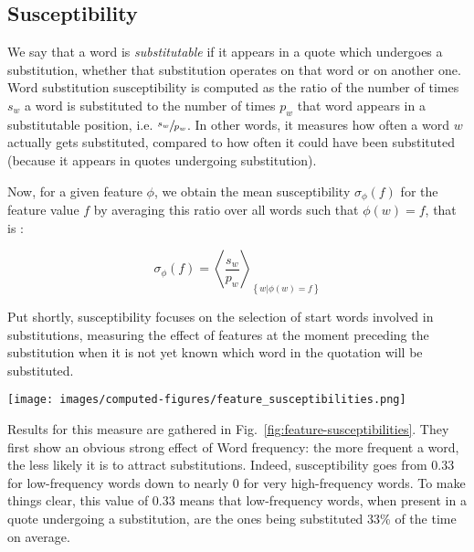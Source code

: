 \subsection{Susceptibility}

We say that a word is \emph{substitutable} if it appears in a quote which undergoes a substitution, whether that substitution operates on that word or on another one.
Word substitution susceptibility is computed as the ratio of the number of times $s_w$ a word is substituted to the number of times $p_w$ that word appears in a substitutable position, \hbox{i.e.} $\sfrac{s_w}{p_w}$. {In other words, it measures how often a word $w$ actually gets substituted, compared to how often it could have been substituted (because it appears in quotes undergoing substitution)}.

Now, for a given feature $\phi$, we obtain the mean susceptibility $\sigma_{\phi}(f)$ for the feature value $f$ by averaging this ratio over all words such that $\phi(w) = f$, that is%
:

$$\sigma_{\phi}(f) = \left< \frac{s_w}{p_w} \right>_{\left\lbrace w | \phi(w) = f \right\rbrace}$$

Put shortly, susceptibility focuses on the selection of start words involved in substitutions, measuring the effect of features at the moment preceding the substitution when it is not yet known which word in the quotation will be substituted.

\begin{figure*}[!th]
    \centering
    \texttt{[image: images/computed-figures/feature\_susceptibilities.png]}
    \caption{\textbf{Substitution susceptibility:} average susceptibility to substitution vs. average feature value of a candidate word for substitution, with 95\% asymptotic confidence intervals.
    The heatmap on the lower-right shows the joint effect of Number of synonyms and Number of phonemes on susceptibility, averaged over the respective single-variable ranges, with sample size (word numbers) in parentheses.}
    \label{fig:feature-susceptibilities}
\end{figure*}
\medskip
Results for this measure are gathered in Fig.~\ref{fig:feature-susceptibilities}. They first show an obvious strong effect of Word frequency: the more frequent a word, the less likely it is to attract substitutions.
Indeed, susceptibility goes from 0.33 for low-frequency words down to nearly 0 for very high-frequency words.
To make things clear, this value of 0.33 means that low-frequency words, when present in a quote undergoing a substitution, are the ones being substituted 33\% of the time on average.

